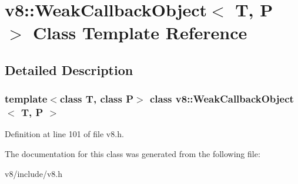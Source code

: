 \hypertarget{classv8_1_1WeakCallbackObject}{}\section{v8\+:\+:Weak\+Callback\+Object$<$ T, P $>$ Class Template Reference}
\label{classv8_1_1WeakCallbackObject}


\subsection{Detailed Description}
\subsubsection*{template$<$class T, class P$>$\newline
class v8\+::\+Weak\+Callback\+Object$<$ T, P $>$}



Definition at line 101 of file v8.\+h.



The documentation for this class was generated from the following file\+:\begin{DoxyCompactItemize}
\item 
v8/include/v8.\+h\end{DoxyCompactItemize}
